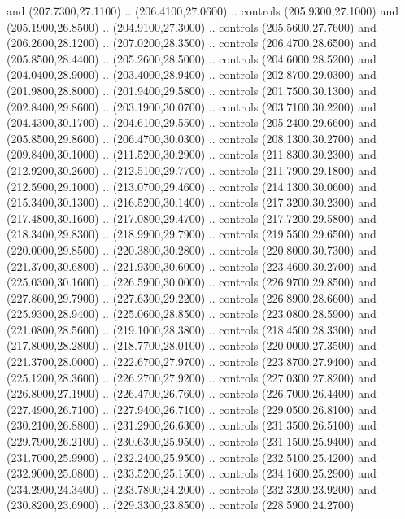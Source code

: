 {\begin{scope}[y=0.80pt, x=0.80pt, yscale=-1, xscale=1, inner sep=0pt, outer sep=0pt, #1]
      and (207.7300,27.1100) .. (206.4100,27.0600) .. controls (205.9300,27.1000)
      and (205.1900,26.8500) .. (204.9100,27.3000) .. controls (205.5600,27.7600)
      and (206.2600,28.1200) .. (207.0200,28.3500) .. controls (206.4700,28.6500)
      and (205.8500,28.4400) .. (205.2600,28.5000) .. controls (204.6000,28.5200)
      and (204.0400,28.9000) .. (203.4000,28.9400) .. controls (202.8700,29.0300)
      and (201.9800,28.8000) .. (201.9400,29.5800) .. controls (201.7500,30.1300)
      and (202.8400,29.8600) .. (203.1900,30.0700) .. controls (203.7100,30.2200)
      and (204.4300,30.1700) .. (204.6100,29.5500) .. controls (205.2400,29.6600)
      and (205.8500,29.8600) .. (206.4700,30.0300) .. controls (208.1300,30.2700)
      and (209.8400,30.1000) .. (211.5200,30.2900) .. controls (211.8300,30.2300)
      and (212.9200,30.2600) .. (212.5100,29.7700) .. controls (211.7900,29.1800)
      and (212.5900,29.1000) .. (213.0700,29.4600) .. controls (214.1300,30.0600)
      and (215.3400,30.1300) .. (216.5200,30.1400) .. controls (217.3200,30.2300)
      and (217.4800,30.1600) .. (217.0800,29.4700) .. controls (217.7200,29.5800)
      and (218.3400,29.8300) .. (218.9900,29.7900) .. controls (219.5500,29.6500)
      and (220.0000,29.8500) .. (220.3800,30.2800) .. controls (220.8000,30.7300)
      and (221.3700,30.6800) .. (221.9300,30.6000) .. controls (223.4600,30.2700)
      and (225.0300,30.1600) .. (226.5900,30.0000) .. controls (226.9700,29.8500)
      and (227.8600,29.7900) .. (227.6300,29.2200) .. controls (226.8900,28.6600)
      and (225.9300,28.9400) .. (225.0600,28.8500) .. controls (223.0800,28.5900)
      and (221.0800,28.5600) .. (219.1000,28.3800) .. controls (218.4500,28.3300)
      and (217.8000,28.2800) .. (218.7700,28.0100) .. controls (220.0000,27.3500)
      and (221.3700,28.0000) .. (222.6700,27.9700) .. controls (223.8700,27.9400)
      and (225.1200,28.3600) .. (226.2700,27.9200) .. controls (227.0300,27.8200)
      and (226.8000,27.1900) .. (226.4700,26.7600) .. controls (226.7000,26.4400)
      and (227.4900,26.7100) .. (227.9400,26.7100) .. controls (229.0500,26.8100)
      and (230.2100,26.8800) .. (231.2900,26.6300) .. controls (231.3500,26.5100)
      and (229.7900,26.2100) .. (230.6300,25.9500) .. controls (231.1500,25.9400)
      and (231.7000,25.9900) .. (232.2400,25.9500) .. controls (232.5100,25.4200)
      and (232.9000,25.0800) .. (233.5200,25.1500) .. controls (234.1600,25.2900)
      and (234.2900,24.3400) .. (233.7800,24.2000) .. controls (232.3200,23.9200)
      and (230.8200,23.6900) .. (229.3300,23.8500) .. controls (228.5900,24.2700)

\end{scope}}
